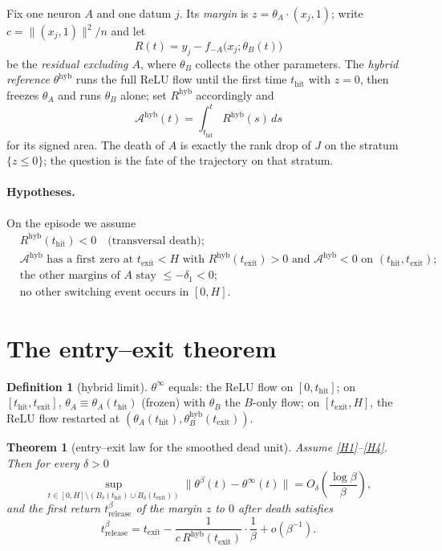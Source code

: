 \documentclass[11pt]{article}
\newtheorem{theorem}{Theorem}
\theoremstyle{definition}
\newtheorem{definition}[definition]{Definition}
\theoremstyle{remark}
\newcommand{\thit}{t_{\mathrm{hit}}}
\newcommand{\texit}{t_{\mathrm{exit}}}
\newcommand{\Ar}{\mathcal{A}}                      %
\newcommand{\hyb}{\mathrm{hyb}}
\begin{document}
Fix one neuron $A$ and one datum $j$. Its \emph{margin} is
$z=\theta_A\cdot(x_j,1)$; write $c=\|(x_j,1)\|^2/n$ and let
\begin{equation}\label{eq:residual}
R(t)=y_j-f_{-A}\bigl(x_j;\theta_B(t)\bigr)
\end{equation}
be the \emph{residual excluding $A$}, where $\theta_B$ collects the other
parameters. The \emph{hybrid reference} $\theta^{\hyb}$ runs the full ReLU flow
until the first time $\thit$ with $z=0$, then freezes $\theta_A$ and runs
$\theta_B$ alone; set $R^{\hyb}$ accordingly and
\begin{equation}\label{eq:area}
\Ar^{\hyb}(t)=\int_{\thit}^{t}R^{\hyb}(s)\,ds
\end{equation}
for its signed area. The death of $A$ is exactly the rank drop of $J$ on the
stratum $\{z\le0\}$; the question is the fate of the trajectory on that stratum.

\paragraph{Hypotheses.} On the episode we assume
\begin{align}
&R^{\hyb}(\thit)<0 \quad\text{(transversal death)};
  \tag{H1}\label{H1}\\
&\Ar^{\hyb}\text{ has a first zero at }\texit<H\text{ with }
  R^{\hyb}(\texit)>0\text{ and }\Ar^{\hyb}<0\text{ on }(\thit,\texit);
  \tag{H2}\label{H2}\\
&\text{the other margins of }A\text{ stay }\le-\delta_1<0;
  \tag{H3}\label{H3}\\
&\text{no other switching event occurs in }[0,H].
  \tag{H4}\label{H4}
\end{align}

\section{The entry--exit theorem}\label{sec:theorem}

\begin{definition}[hybrid limit]\label{def:hybrid}
$\theta^\infty$ equals: the ReLU flow on $[0,\thit]$; on $[\thit,\texit]$,
$\theta_A\equiv\theta_A(\thit)$ (frozen) with $\theta_B$ the $B$-only flow; on
$[\texit,H]$, the ReLU flow restarted at
$(\theta_A(\thit),\theta_B^{\hyb}(\texit))$.
\end{definition}

\begin{theorem}[entry--exit law for the smoothed dead unit]\label{thm:main}
Assume \eqref{H1}--\eqref{H4}. Then for every $\delta>0$
\begin{equation}\label{eq:sup}
\sup_{t\in[0,H]\setminus(B_\delta(\thit)\cup B_\delta(\texit))}
\bigl\|\theta^\beta(t)-\theta^\infty(t)\bigr\|
= O_\delta\!\left(\frac{\log\beta}{\beta}\right),
\end{equation}
and the first return $t^\beta_{\mathrm{release}}$ of the margin $z$ to $0$ after
death satisfies
\begin{equation}\label{eq:release}
t^\beta_{\mathrm{release}}
=\texit-\frac{1}{c\,R^{\hyb}(\texit)}\cdot\frac{1}{\beta}+o(\beta^{-1}).
\end{equation}
\end{theorem}
\end{document}

